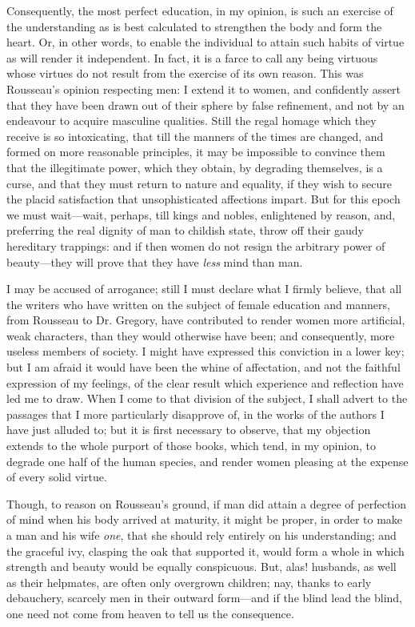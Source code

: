 Consequently, the most perfect education, in my opinion, is such an
exercise of the understanding as is best calculated to strengthen the
body and form the heart. Or, in other words, to enable the individual
to attain such habits of virtue as will render it independent. In
fact, it is a farce to call any being virtuous whose virtues do not
result from the exercise of its own reason. This was Rousseau's
opinion respecting men: I extend it to women, and confidently assert
that they have been drawn out of their sphere by false refinement, and
not by an endeavour to  acquire masculine qualities. Still
the regal homage which they receive is so intoxicating, that till the
manners of the times are changed, and formed on more reasonable
principles, it may be impossible to convince them that the
illegitimate power, which they obtain, by degrading themselves, is a
curse, and that they must return to nature and equality, if they wish
to secure the placid satisfaction that unsophisticated affections
impart. But for this epoch we must wait---wait, perhaps, till kings
and nobles, enlightened by reason, and, preferring the real dignity of
man to childish state, throw off their gaudy hereditary trappings: and
if then women do not resign the arbitrary power of beauty---they will
prove that they have \textit{less} mind than man.

I may be accused of arrogance; still I must declare what I firmly
believe, that all the writers who have written on the subject of
female education and manners, from Rousseau to Dr. Gregory, have
contributed to render women more artificial, weak characters, than
they would otherwise have been; and consequently, more useless members
of society. I might have expressed this conviction in a lower key; but
I am afraid it would have  been the whine of affectation, and
not the faithful expression of my feelings, of the clear result which
experience and reflection have led me to draw. When I come to that
division of the subject, I shall advert to the passages that I more
particularly disapprove of, in the works of the authors I have just
alluded to; but it is first necessary to observe, that my objection
extends to the whole purport of those books, which tend, in my
opinion, to degrade one half of the human species, and render women
pleasing at the expense of every solid virtue.

Though, to reason on Rousseau's ground, if man did attain a degree of
perfection of mind when his body arrived at maturity, it might be
proper, in order to make a man and his wife \textit{one}, that she
should rely entirely on his understanding; and the graceful ivy,
clasping the oak that supported it, would form a whole in which
strength and beauty would be equally conspicuous. But, alas! husbands,
as well as their helpmates, are often only overgrown children; nay,
thanks to early debauchery, scarcely men in their outward form---and
if the blind lead the blind, one need not come from heaven to tell us
the consequence.

